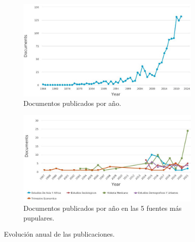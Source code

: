 \begin{figure}[ht]
	
	\centering
	\begin{subfigure}[b]{0.48\textwidth}
		\centering
		\includegraphics[width=1\textwidth]{imagenes/Scopus-Analyze-Year.jpg}
		\caption{Documentos publicados por año.}
		\label{fig:papers} 
	\end{subfigure}
	\hfill
	\begin{subfigure}[b]{0.48\textwidth}
		\centering
		\includegraphics[width=1\textwidth]{imagenes/Scopus-Analyze-Source.jpg}
		\caption{Documentos publicados por año en las 5 fuentes más pupulares.}
		\label{fig:papers} 
	\end{subfigure}
	\caption{Evolución anual de las publicaciones.}
	\label{fig:docs_evolución} 
\end{figure}